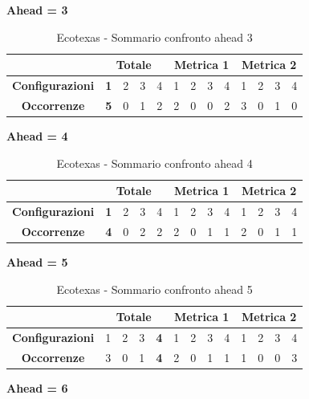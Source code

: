 \documentclass[12pt,a4paper,oneside,openright]{book}
\begin{document}
\medskip
\textbf{Ahead = 3}


\begin{table}[H]
\centering
\begin{tabular}{|c|c|c|c|c|c|c|c|c|c|c|c|c|}
\hline
 & \multicolumn{4}{|c|}{\textbf{Totale}} & \multicolumn{4}{|c|}{\textbf{Metrica 1}} & \multicolumn{4}{|c|}{\textbf{Metrica 2}} \\
\hline
\textbf{Configurazioni} & \textbf{1} & 2 & 3 & 4 & 1 & 2 & 3 & 4 & 1 & 2 & 3 & 4 \\
\hline
\textbf{Occorrenze} & \textbf{5} & 0 & 1 & 2 & 2 & 0 & 0 & 2 & 3 & 0 & 1 & 0\\
\hline
\end{tabular}
\caption{Ecotexas - Sommario confronto ahead 3}
\end{table}

\medskip
\textbf{Ahead = 4}


\begin{table}[H]
\centering
\begin{tabular}{|c|c|c|c|c|c|c|c|c|c|c|c|c|}
\hline
 & \multicolumn{4}{|c|}{\textbf{Totale}} & \multicolumn{4}{|c|}{\textbf{Metrica 1}} & \multicolumn{4}{|c|}{\textbf{Metrica 2}} \\
\hline
\textbf{Configurazioni} & \textbf{1} & 2 & 3 & 4 & 1 & 2 & 3 & 4 & 1 & 2 & 3 & 4 \\
\hline
\textbf{Occorrenze} & \textbf{4} & 0 & 2 & 2 & 2 & 0 & 1 & 1 & 2 & 0 & 1 & 1\\
\hline
\end{tabular}
\caption{Ecotexas - Sommario confronto ahead 4}
\end{table}

\medskip
\textbf{Ahead = 5}


\begin{table}[H]
\centering
\begin{tabular}{|c|c|c|c|c|c|c|c|c|c|c|c|c|}
\hline
 & \multicolumn{4}{|c|}{\textbf{Totale}} & \multicolumn{4}{|c|}{\textbf{Metrica 1}} & \multicolumn{4}{|c|}{\textbf{Metrica 2}} \\
\hline
\textbf{Configurazioni} & 1 & 2 & 3 & \textbf{4} & 1 & 2 & 3 & 4 & 1 & 2 & 3 & 4 \\
\hline
\textbf{Occorrenze} & 3 & 0 & 1 & \textbf{4} & 2 & 0 & 1 & 1 & 1 & 0 & 0 & 3\\
\hline
\end{tabular}
\caption{Ecotexas - Sommario confronto ahead 5}
\end{table}

\newpage
\textbf{Ahead = 6}
\end{document}
